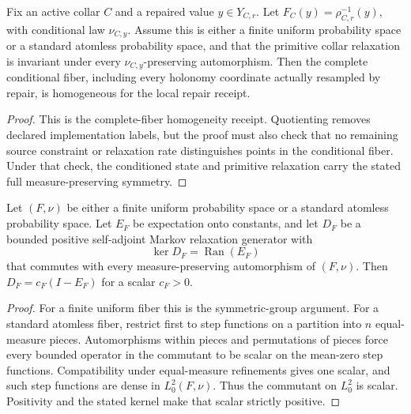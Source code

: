 \begin{lemma}
\label{lem:ym-fiber-symmetry}
Fix an active collar \(C\) and a repaired value \(y\in Y_{C,r}\). Let
\(F_C(y)=\rho_{C,r}^{-1}(y)\), with conditional law \(\nu_{C,y}\). Assume this is either a finite
uniform probability space or a standard atomless probability space, and that the primitive collar
relaxation is invariant under every \(\nu_{C,y}\)-preserving automorphism. Then the complete
conditional fiber, including every holonomy coordinate actually resampled by repair, is
homogeneous for the local repair receipt.
\end{lemma}

\begin{proof}
This is the complete-fiber homogeneity receipt. Quotienting removes declared implementation
labels, but the proof must also check that no remaining source constraint or relaxation rate
distinguishes points in the conditional fiber. Under that check, the conditioned state and
primitive relaxation carry the stated full measure-preserving symmetry.
\end{proof}

\begin{lemma}
\label{lem:ym-scalar-relaxation}
Let \((F,\nu)\) be either a finite uniform probability space or a standard atomless probability
space. Let \(E_F\) be expectation onto constants, and let \(D_F\) be a bounded positive
self-adjoint Markov relaxation generator with
\[
\ker D_F=\operatorname{Ran}(E_F)
\]
that commutes with every measure-preserving automorphism of \((F,\nu)\). Then
\(D_F=c_F(I-E_F)\) for a scalar \(c_F>0\).
\end{lemma}

\begin{proof}
For a finite uniform fiber this is the symmetric-group argument. For a standard atomless fiber,
restrict first to step functions on a partition into \(n\) equal-measure pieces. Automorphisms
within pieces and permutations of pieces force every bounded operator in the commutant to be
scalar on the mean-zero step functions. Compatibility under equal-measure refinements gives one
scalar, and such step functions are dense in \(L^2_0(F,\nu)\). Thus the commutant on
\(L^2_0\) is scalar. Positivity and the stated kernel make that scalar strictly positive.
\end{proof}

